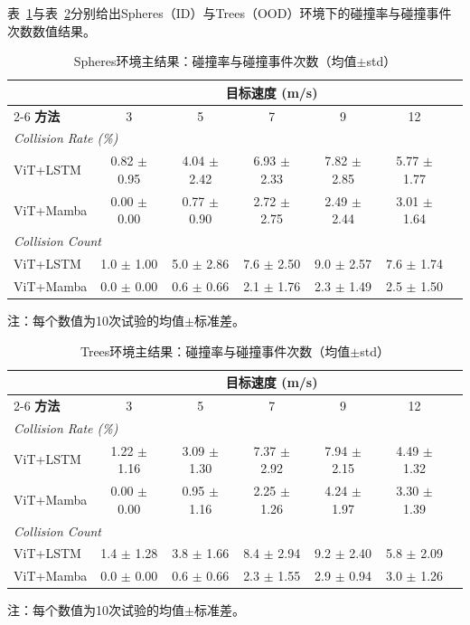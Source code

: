表~\ref{tab:main_spheres_ch3}与表~\ref{tab:main_trees_ch3}分别给出Spheres（ID）与Trees（OOD）环境下的碰撞率与碰撞事件次数数值结果。
\begin{table}[htbp]
\centering
\caption{Spheres环境主结果：碰撞率与碰撞事件次数（均值$\pm$std）}
\label{tab:main_spheres_ch3}
\begin{tabular}{lcccccc}
\toprule
 & \multicolumn{5}{c}{\textbf{目标速度 (m/s)}} \\
\cmidrule(lr){2-6}
\textbf{方法} & 3 & 5 & 7 & 9 & 12 \\
\midrule
\multicolumn{6}{l}{\textit{Collision Rate (\%)}} \\
ViT+LSTM & 0.82 $\pm$ 0.95 & 4.04 $\pm$ 2.42 & 6.93 $\pm$ 2.33 & 7.82 $\pm$ 2.85 & 5.77 $\pm$ 1.77 \\
ViT+Mamba & 0.00 $\pm$ 0.00 & 0.77 $\pm$ 0.90 & 2.72 $\pm$ 2.75 & 2.49 $\pm$ 2.44 & 3.01 $\pm$ 1.64 \\
\midrule
\multicolumn{6}{l}{\textit{Collision Count}} \\
ViT+LSTM & 1.0 $\pm$ 1.00 & 5.0 $\pm$ 2.86 & 7.6 $\pm$ 2.50 & 9.0 $\pm$ 2.57 & 7.6 $\pm$ 1.74 \\
ViT+Mamba & 0.0 $\pm$ 0.00 & 0.6 $\pm$ 0.66 & 2.1 $\pm$ 1.76 & 2.3 $\pm$ 1.49 & 2.5 $\pm$ 1.50 \\
\bottomrule
\end{tabular}
\begin{tablenotes}
\item {} 注：每个数值为10次试验的均值$\pm$标准差。
\end{tablenotes}
\end{table}

\begin{table}[htbp]
\centering
\caption{Trees环境主结果：碰撞率与碰撞事件次数（均值$\pm$std）}
\label{tab:main_trees_ch3}
\begin{tabular}{lcccccc}
\toprule
 & \multicolumn{5}{c}{\textbf{目标速度 (m/s)}} \\
\cmidrule(lr){2-6}
\textbf{方法} & 3 & 5 & 7 & 9 & 12 \\
\midrule
\multicolumn{6}{l}{\textit{Collision Rate (\%)}} \\
ViT+LSTM & 1.22 $\pm$ 1.16 & 3.09 $\pm$ 1.30 & 7.37 $\pm$ 2.92 & 7.94 $\pm$ 2.15 & 4.49 $\pm$ 1.32 \\
ViT+Mamba & 0.00 $\pm$ 0.00 & 0.95 $\pm$ 1.16 & 2.25 $\pm$ 1.26 & 4.24 $\pm$ 1.97 & 3.30 $\pm$ 1.39 \\
\midrule
\multicolumn{6}{l}{\textit{Collision Count}} \\
ViT+LSTM & 1.4 $\pm$ 1.28 & 3.8 $\pm$ 1.66 & 8.4 $\pm$ 2.94 & 9.2 $\pm$ 2.40 & 5.8 $\pm$ 2.09 \\
ViT+Mamba & 0.0 $\pm$ 0.00 & 0.6 $\pm$ 0.66 & 2.3 $\pm$ 1.55 & 2.9 $\pm$ 0.94 & 3.0 $\pm$ 1.26 \\
\bottomrule
\end{tabular}
\begin{tablenotes}
\item {} 注：每个数值为10次试验的均值$\pm$标准差。
\end{tablenotes}
\end{table}

